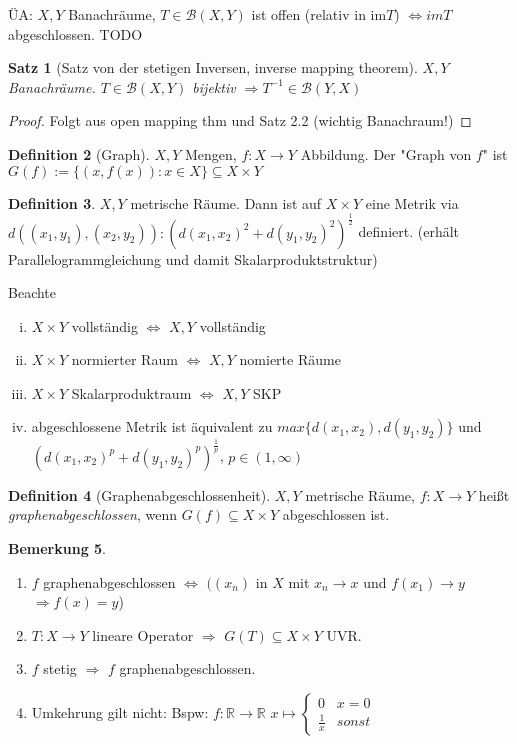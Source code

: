 \documentclass[ngerman]{report}
\theoremstyle{plain}%
\newtheorem{thm}{Satz}[chapter]
\theoremstyle{definition}%
\newtheorem{definition}[thm]{Definition}
\theoremstyle{myStyle}
\newtheorem{bem}[thm]{Bemerkung}
\newcommand{\R}{\mathbb{R}}
\newcommand{\B}{\mathcal{B}} %
\newcommand{\BS}[1][X,Y]{\mathcal{B}(#1)} %
\newcommand{\df}[1][]{%
	\overset{#1}{\Rightarrow}
}
\newcommand{\aq}{\Leftrightarrow} %
\newcommand{\inv}[1]{#1^{-1}}
\newcommand{\qmarks}[1]{"#1"}
\begin{document}
	ÜA: $X,Y$ Banachräume, $T\in \BS$ ist offen (relativ in im$T$) $\Leftrightarrow imT$ abgeschlossen. TODO

	\begin{thm}[Satz von der stetigen Inversen, inverse mapping theorem]
	$X, Y$ Banachräume. $T\in\BS$ bijektiv $\df \inv{T}\in \B(Y,X)$	
	\end{thm}
	
	\begin{proof}
		Folgt aus open mapping thm und Satz 2.2 (wichtig Banachraum!)
	\end{proof}

	\begin{definition}[Graph]
		$X,Y$ Mengen, $f: X\to Y$ Abbildung. Der \qmarks{Graph von $f$} ist 
			$G(f) := \{(x,f(x)) : x\in X\} \subseteq X\times Y$
	\end{definition}

	\begin{definition}
		$X,Y$ metrische Räume. Dann ist auf $X\times Y$ eine Metrik via 
			$d((x_1,y_1),(x_2,y_2)) : (d(x_1,x_2)^2 + d(y_1,y_2)^2)^{\frac{1}{2}}$ definiert. (erhält Parallelogrammgleichung und damit Skalarproduktstruktur)
	\end{definition}

	Beachte 
		\begin{enumerate}[(i)]
			\item $X\times Y$ vollständig $\Leftrightarrow$ $X, Y$ vollständig
			\item $X\times Y$ normierter Raum $\Leftrightarrow$ $X,Y$ nomierte Räume
			\item $X\times Y$ Skalarproduktraum $\Leftrightarrow$ $X,Y$ SKP
			\item abgeschlossene Metrik ist äquivalent zu $max\{d(x_1,x_2),d(y_1,y_2)\}$ und 
			$(d(x_1,x_2)^p + d(y_1,y_2)^p)^{\frac{1}{p}}$, $p\in (1,\infty)$
		\end{enumerate}

	\begin{definition}[Graphenabgeschlossenheit]
		$X,Y$ metrische Räume, $f: X\to Y$ heißt \textit{graphenabgeschlossen}, wenn $G(f) \subseteq X\times Y$ abgeschlossen ist.	
	\end{definition}

	\begin{bem}
		\begin{enumerate}
			\item $f$ graphenabgeschlossen $\aq$ $( (x_n)$ in $X$ mit $x_n \to x$ und $f(x_1) \to y$ 
			$\df f(x) = y$)
			\item $T: X\to Y$ lineare Operator $\df$ $G(T) \subseteq X\times Y$ UVR.
			\item $f$ stetig $\df$ $f$ graphenabgeschlossen.
			\item Umkehrung gilt nicht: Bspw: $f: \R \to \R$ 
				$x\mapsto \begin{cases} 0& x=0\\ \frac{1}{x} & sonst \end{cases}$
		\end{enumerate}
	\end{bem}
\end{document}
